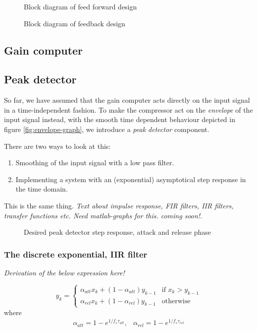 \documentclass[]{article}
\begin{document}
\begin{figure}[ht]
\centering

\caption{Block diagram of feed forward design}
\label{fig:feedforward-blockdiagram}
\end{figure}

\begin{figure}[ht]
\centering

\caption{Block diagram of feedback design} 
\label{fig:feedback-blockdiagram}
\end{figure}

\subsection{Gain computer}
\subsection{Peak detector}
So far, we have assumed that the gain computer acts directly on the input signal in a time-independent fashion. To make the compressor act on the \emph{envelope} of the input signal instead, with the smooth time dependent behaviour depicted in figure \ref{fig:envelope-graph}, we introduce a \emph{peak detector} component.

There are two ways to look at this:
\begin{enumerate}
\item Smoothing of the input signal with a low pass filter.
\item Implementing a system with an (exponential) asymptotical step response in the time domain.
\end{enumerate}

This is the same thing. \emph{Text about impulse response, FIR filters, IIR filters, transfer functions etc. Need matlab-graphs for this. coming soon!}.

\begin{figure}[ht]
\centering

\caption{Desired peak detector step response, attack and release phase} 
\label{fig:attack-release-graph}
\end{figure}

\subsubsection{The discrete exponential, IIR filter}
\emph{Derivation of the below expression here!}

\begin{equation}
y_k = \left\{
  \begin{array}{ll}
    \alpha_{att} x_k + (1-\alpha_{att})y_{k-1} & \text{if }  x_k > y_{k-1} \\
    \alpha_{rel} x_k + (1-\alpha_{rel})y_{k-1} & \text{otherwise} 
  \end{array}
\right.
\end{equation}
where
\begin{equation}
\begin{array}{lr}
\alpha_{att} = 1-e^{1/f_s \tau_{att}}, & \alpha_{rel} = 1-e^{1/f_s \tau_{rel}}
\end{array}
\end{equation}
\end{document}
